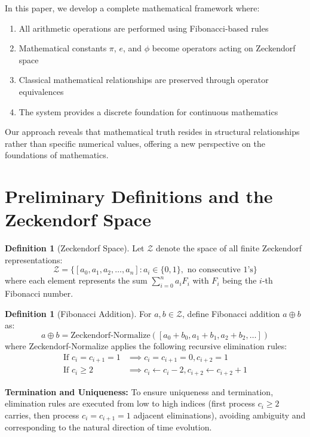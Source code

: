 \documentclass[12pt]{article}
\theoremstyle{plain}
\theoremstyle{definition}
\newtheorem{definition}[theorem]{Definition}
\begin{document}
In this paper, we develop a complete mathematical framework where:
\begin{enumerate}
\item All arithmetic operations are performed using Fibonacci-based rules
\item Mathematical constants $\pi$, $e$, and $\phi$ become operators acting on Zeckendorf space
\item Classical mathematical relationships are preserved through operator equivalences
\item The system provides a discrete foundation for continuous mathematics
\end{enumerate}

Our approach reveals that mathematical truth resides in structural relationships rather than specific numerical values, offering a new perspective on the foundations of mathematics.

\section{Preliminary Definitions and the Zeckendorf Space}

\begin{definition}[Zeckendorf Space]
Let $\mathcal{Z}$ denote the space of all finite Zeckendorf representations:
$$\mathcal{Z} = \{[a_0, a_1, a_2, \ldots, a_n] : a_i \in \{0,1\}, \text{ no consecutive 1's}\}$$
where each element represents the sum $\sum_{i=0}^n a_i F_i$ with $F_i$ being the $i$-th Fibonacci number.
\end{definition}

\begin{definition}[Fibonacci Addition]
For $a, b \in \mathcal{Z}$, define Fibonacci addition $a \oplus b$ as:
$$a \oplus b = \text{Zeckendorf-Normalize}([a_0+b_0, a_1+b_1, a_2+b_2, \ldots])$$
where Zeckendorf-Normalize applies the following recursive elimination rules:
\begin{align}
\text{If } c_i = c_{i+1} = 1 &\implies c_i = c_{i+1} = 0, c_{i+2} = 1\\
\text{If } c_i \geq 2 &\implies c_i \leftarrow c_i - 2, c_{i+2} \leftarrow c_{i+2} + 1
\end{align}

\textbf{Termination and Uniqueness:} To ensure uniqueness and termination, elimination rules are executed from low to high indices (first process $c_i \geq 2$ carries, then process $c_i = c_{i+1} = 1$ adjacent eliminations), avoiding ambiguity and corresponding to the natural direction of time evolution.
\end{definition}
\end{document}
